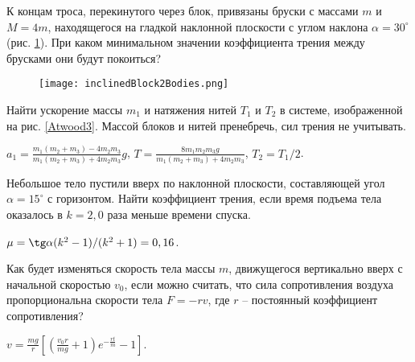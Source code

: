 \begin{ex}
К концам троса, перекинутого через блок, привязаны бруски с массами $m$ и $M = 4m$, находящегося на гладкой наклонной плоскости с углом наклона $\alpha = 30^{\circ}$ (рис. \ref{inclinedBlock2Bodies}). При каком минимальном значении коэффициента трения между брусками они будут покоиться?
\end{ex}

\begin{figure}[h]
\centering
\texttt{[image: inclinedBlock2Bodies.png]}
\caption{}
\label{inclinedBlock2Bodies}
\end{figure}

\complexProblems

\begin{ex} %
Найти ускорение массы $m_1$ и натяжения нитей $T_1$ и $T_2$ в системе, изображенной на рис. \ref{Atwood3}. Массой блоков и нитей пренебречь, сил трения не учитывать.
\begin{ans}
$a_1 = \frac{m_1(m_2+m_3)-4m_2m_3}{m_1(m_2+m_3)+4m_2m_3}g$, $T= \frac{8m_1m_2m_3g}{m_1(m_2+m_3)+4m_2m_3}$, $T_2 = T_1/2$.
\end{ans}
\end{ex}

\begin{ex} %
Небольшое тело пустили вверх по наклонной плоскости, составляющей угол $\alpha  = 15^{\circ}$ с горизонтом. Найти коэффициент трения, если время подъема тела оказалось в $k = 2,0$ раза меньше времени спуска.
\begin{ans}
$\mu = \tg \alpha (k^2-1)/(k^2+1) = 0,16$.
\end{ans}
\end{ex}

\begin{ex} %
Как будет изменяться скорость тела массы $m$, движущегося вертикально вверх с начальной скоростью $v_0$, если можно считать, что сила сопротивления воздуха пропорциональна скорости тела $F = -rv$, где $r$ -- постоянный коэффициент сопротивления?
\begin{ans}
$v = \frac{mg}{r}\left[ \left( \frac{v_0r}{mg} +1 \right)e^{-\frac{rt}{m}} - 1 \right]$.
\end{ans}
\end{ex}

\clearpage